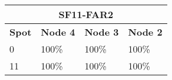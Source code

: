 \begin{tabular}{|l|l|l|l|}
\multicolumn{4}{c}{\textbf{SF11-FAR2}} \\ \hline 
\textbf{Spot} & \textbf{Node 4} & \textbf{Node 3} & \textbf{Node 2} \\ \hline
0 & 100\% & 100\% & 100\% \\ \hline
11 & 100\% & 100\% & 100\% \\ \hline
\end{tabular}
